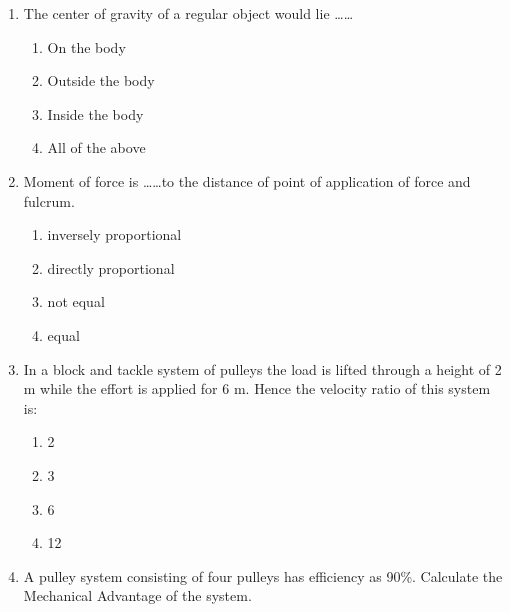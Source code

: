 \begin{enumerate}[label=(\roman*)]
    \item The center of gravity of a regular object would lie \dots\dots

        \begin{enumerate}[label=(\alph*)]
            \setlength\itemsep{0em}
            \item On the body
            \item Outside the body
            \item Inside the body
            \item All of the above
        \end{enumerate}

    \item Moment of force is \dots\dots to the distance of point of 
        application of force and fulcrum.

        \begin{enumerate}[label=(\alph*)]
            \item inversely proportional 
            \item directly proportional 
            \item not equal
            \item equal
        \end{enumerate}

    \item In a block and tackle system of pulleys the load is lifted through a 
        height of 2 m while the effort is applied for 6 m. Hence the velocity
        ratio of this system is:

        \begin{multicols}{4}
        \begin{enumerate}[label=(\alph*)]
            \item 2
            \item 3
            \item 6
            \item 12
        \end{enumerate}
        \end{multicols}

    \item A pulley system consisting of four pulleys has efficiency as 90\%.
        Calculate the Mechanical Advantage of the system.


\end{enumerate}
